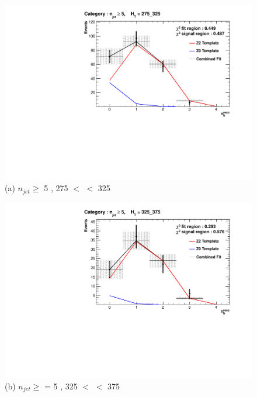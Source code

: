  \begin{figure}[ht]
\footnotesize
\centering
\begin{minipage}[b]{0.50\linewidth}
\includegraphics[width = 1.0\linewidth]{plots/ThesisPlots/Final_Fit_To_Data_Normal_Medium_HTBin_OneMuon_275_325_jet_mult_5.pdf}
\centering (a) $n_{jet} \geq$  5 , 275 $<$ \theht $<$ 325
\end{minipage}
\footnotesize
\centering
\begin{minipage}[b]{0.50\linewidth}
\includegraphics[width = 1.0\linewidth]{plots/ThesisPlots/Final_Fit_To_Data_Normal_Medium_HTBin_OneMuon_325_375_jet_mult_5.pdf}
\centering (b) $n_{jet} \geq$ = 5 , 325 $<$ \theht $<$ 375 
\end{minipage}
\footnotesize
\centering
\begin{minipage}[b]{0.51\linewidth}

\end{minipage}
\end{figure}

